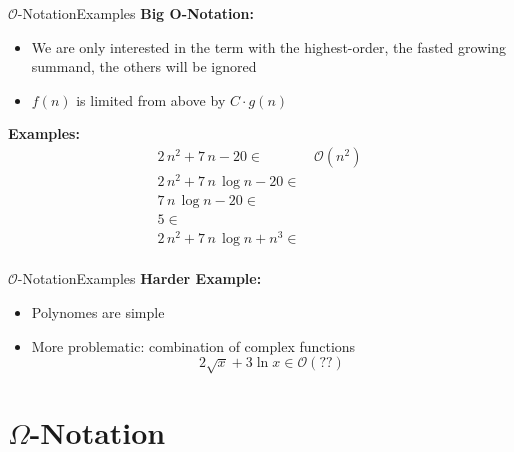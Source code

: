 \begin{frame}{$\mathcal{O}$-Notation}{Examples}
  \textbf{Big O-Notation:}
  \begin{itemize}
    \item
      We are only interested in the term with the highest-order,
      the fasted growing summand, the others will be ignored
    \item
      $f(n)$ is limited {\color{Mittel-Blau}from above} by $C \cdot g(n)$
  \end{itemize}
  \textbf{Examples:}
  \begin{align*}
     2 \, n^2 + 7 \, n - 20 \in & \,\mathcal{O}(n^2)\\
     2 \, n^2 + 7 \, n \, \log n - 20 \in & {}\\
     7 \, n \, \log n - 20 \in & {}\\
     5 \in & {}\\
     2 \, n^2 + 7 \, n \, \log n + n^3 \in & {}\\
  \end{align*}
\end{frame}


\begin{frame}{$\mathcal{O}$-Notation}{Examples}
  \textbf{Harder Example:}
  \begin{itemize}
    \item Polynomes are simple
    \item More problematic: combination of complex functions
      \begin{displaymath}
        2 \sqrt{x} + 3 \ln x \in \mathcal{O} (??)
      \end{displaymath}
  \end{itemize}
\end{frame}


\section{\texorpdfstring{$\Omega$}{Omega}-Notation}

